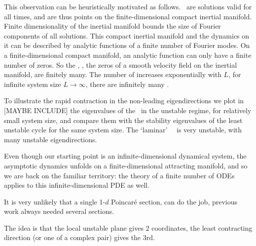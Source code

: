 This observation can be heuristically motivated as follows.
\Eqva\ are solutions valid for all times, and are thus points
on the finite-dimensional compact inertial manifold.
Finite dimensionality of the inertial manifold
bounds the size of Fourier components of all solutions.
This
compact inertial manifold and the dynamics on it can be
described by analytic functions of a finite number of Fourier modes.
On a finite-dimensional compact manifold,
an analytic function can only have a finite number
of zeros. So the {\eqva}, {\ie},
the zeros of a smooth velocity field on
the inertial manifold, are finitely many.
The number of {\eqva} increases exponentially with $L$,
for infinite system size $L \to \infty$,
there are infinitely many {\eqva}.

\bigskip

To illustrate the rapid contraction in the non-leading eigendirections
we plot  in [MAYBE INCLUDE] %
the eigenvalues of the \eqv\ in the unstable regime,
for relatively small system size, %
and compare them with the
stability eigenvalues of the least unstable cycle for the same
system size.
The `laminar' ~\eqv\ is very unstable,
with many unstable eigendirections.


\bigskip

Even though our starting point  is an infinite-dimensional
dynamical system, the asymptotic dynamics unfolds on a
finite-dimensional attracting manifold, and so we are back on the
familiar territory: the theory of a finite number of ODEs applies to
this infinite-dimensional PDE as well.

\bigskip

It is very unlikely that a single 1-$d$ Poincar\'e section, can
do the job, previous work always needed
several sections.

The idea is that the local unstable plane gives 2 coordinates, the
least contracting direction (or one of a complex pair) gives the 3rd.

